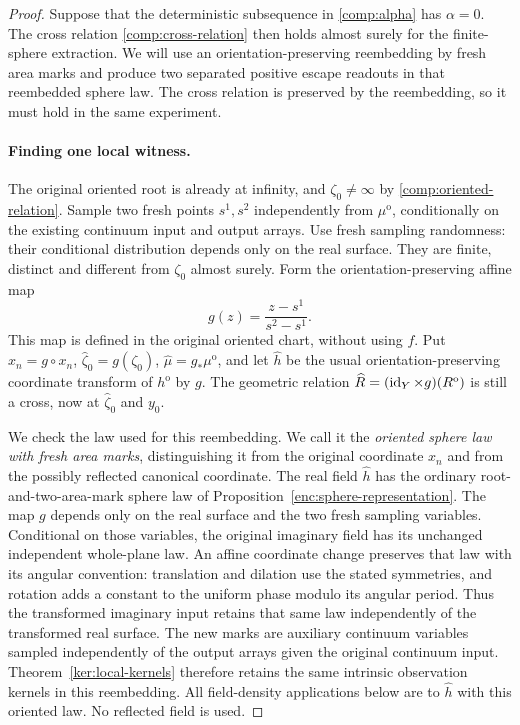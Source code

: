 \begin{proof}
Suppose that the deterministic subsequence in
\eqref{comp:alpha} has $\alpha=0$.  The cross relation
\eqref{comp:cross-relation} then holds almost surely for the
finite-sphere extraction.  We will use an orientation-preserving
reembedding by fresh area marks and produce two separated positive
escape readouts in that reembedded sphere law.  The cross relation
is preserved by the reembedding, so it must hold in the same
experiment.

\paragraph{Finding one local witness.}
The original oriented root is already at infinity, and
$\zeta_0\ne\infty$ by \eqref{comp:oriented-relation}.  Sample two
fresh points $s^1,s^2$ independently from $\mu^{\mathrm o}$,
conditionally on the existing continuum input and output arrays.
Use fresh sampling randomness: their conditional distribution depends
only on the real surface.  They are finite, distinct and different
from $\zeta_0$ almost surely.  Form the orientation-preserving affine
map
\[
 g(z)=\frac{z-s^1}{s^2-s^1}.
\]
This map is defined in the original oriented chart, without using $f$.
Put $\widehat x_n=g\circ x_n$, $\widehat\zeta_0=g(\zeta_0)$,
$\widehat\mu=g_*\mu^{\mathrm o}$, and let $\widehat h$ be the usual
orientation-preserving coordinate transform of $h^{\mathrm o}$ by
$g$.  The geometric relation
$\widehat R=(\operatorname{id}_Y\times g)(R^{\mathrm o})$ is still a cross, now
at $\widehat\zeta_0$ and $y_0$.

We check the law used for this reembedding.  We call it the
\emph{oriented sphere law with fresh area marks}, distinguishing it
from the original coordinate $x_n$ and from the possibly reflected
canonical coordinate.  The real field $\widehat h$ has the ordinary
root-and-two-area-mark sphere law of
Proposition~\ref{enc:sphere-representation}.  The map $g$ depends
only on the real surface and the two fresh sampling variables.
Conditional on those variables, the original imaginary field has
its unchanged independent whole-plane law.  An affine coordinate
change preserves that law with its angular convention: translation
and dilation use the stated symmetries, and rotation adds a constant
to the uniform phase modulo its angular period.  Thus the transformed
imaginary input retains that same law independently of the transformed
real surface.  The new marks are auxiliary continuum variables
sampled independently of the output arrays given the original
continuum input.  Theorem~\ref{ker:local-kernels} therefore retains
the same intrinsic observation kernels in this reembedding.  All
field-density applications below are to $\widehat h$ with this
oriented law.  No reflected field is used.


\end{proof}
